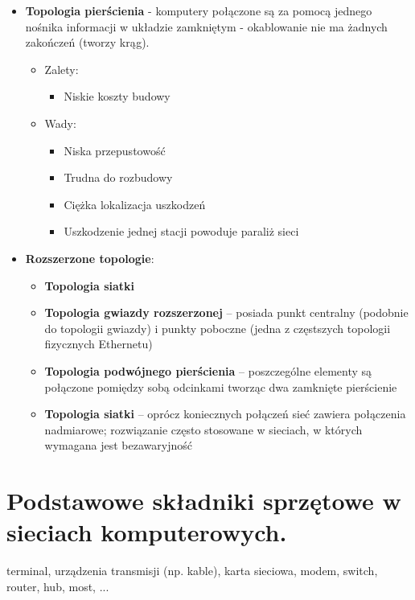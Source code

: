 \documentclass[12pt,a4paper]{article}
\begin{document}
\begin{itemize}
		\item \textbf{Topologia pierścienia} - komputery połączone są za pomocą jednego nośnika informacji w układzie zamkniętym - okablowanie nie ma żadnych zakończeń (tworzy krąg).
		\begin{itemize}
			\item Zalety:
			\begin{itemize}
				\item Niskie koszty budowy
			\end{itemize}
			\item Wady:
			\begin{itemize}
				\item Niska przepustowość
				\item Trudna do rozbudowy
				\item Ciężka lokalizacja uszkodzeń
				\item Uszkodzenie jednej stacji powoduje paraliż sieci
			\end{itemize}
		\end{itemize}
		
		\item \textbf{Rozszerzone topologie}:
		\begin{itemize}
			\item \textbf{Topologia siatki}
			\item \textbf{Topologia gwiazdy rozszerzonej} – posiada punkt centralny (podobnie do topologii gwiazdy) i punkty poboczne (jedna z częstszych topologii fizycznych Ethernetu)
			\item \textbf{Topologia podwójnego pierścienia} – poszczególne elementy są połączone pomiędzy sobą odcinkami tworząc dwa zamknięte pierścienie
			\item \textbf{Topologia siatki} – oprócz koniecznych połączeń sieć zawiera połączenia nadmiarowe; rozwiązanie często stosowane w sieciach, w których wymagana jest bezawaryjność
		\end{itemize}
	\end{itemize}

	\section{Podstawowe składniki sprzętowe w sieciach komputerowych.}
	terminal, urządzenia transmisji (np. kable), karta sieciowa, modem, switch, router, hub, most, ...
\end{document}
